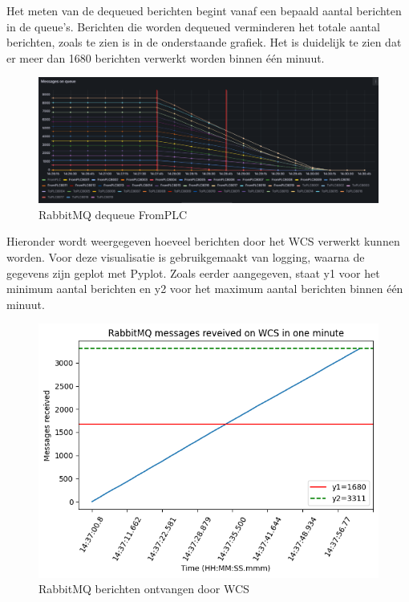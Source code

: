 Het meten van de dequeued berichten begint vanaf een bepaald aantal berichten in de queue's.
Berichten die worden dequeued verminderen het totale aantal berichten, zoals te zien is in de onderstaande grafiek.
Het is duidelijk te zien dat er meer dan 1680 berichten verwerkt worden binnen één minuut.
\begin{figure}[h!]
  \centering
  \includegraphics[width=.95\textwidth]{img/rabbitmq-dequeue-count-FromPLC.png}
  \caption{\label{fig:rabbitmq_dequeue_fromplc_count}RabbitMQ dequeue FromPLC}
\end{figure}
\newpage



Hieronder wordt weergegeven hoeveel berichten door het WCS verwerkt kunnen worden.
Voor deze visualisatie is gebruikgemaakt van logging, waarna de gegevens zijn geplot met Pyplot.
Zoals eerder aangegeven, staat y1 voor het minimum aantal berichten en y2 voor het maximum aantal berichten binnen één minuut.
\begin{figure}[h!]
  \centering
  \includegraphics[width=.80\textwidth]{img/rabbitmq_received_wcs.png}
  \caption{\label{fig:rabbitmq_received_wcs}RabbitMQ berichten ontvangen door WCS}
\end{figure}

